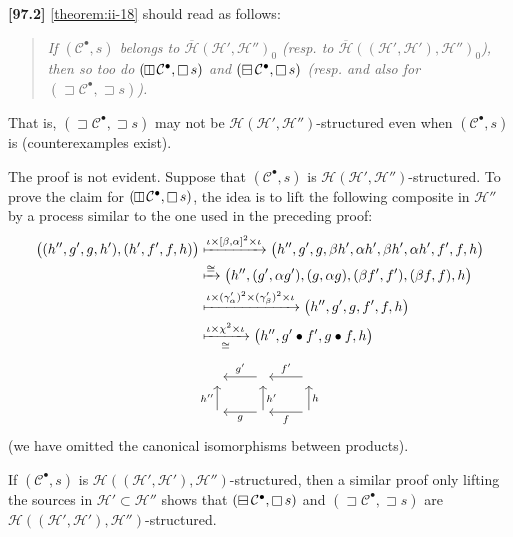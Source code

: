 \documentclass[a4paper,fleqn]{article}
\theoremstyle{plain}
\theoremstyle{definition}
\newenvironment{longcomm}[1]
  {\noindent\textbf{[#1]}\rmfamily}
  {}
\newcommand{\CC}{\mathcal{C}}
\newcommand{\HH}{\mathcal{H}}
\newcommand{\hsqbox}{{\boxminus}}
\newcommand{\vsqbox}{{\rotatebox{90}{$\boxminus$}}}
\DeclareMathOperator{\sq}{\square}
\DeclareMathOperator{\hsq}{\raisebox{-.05em}{$\hsqbox$}}
\DeclareMathOperator{\vsq}{\raisebox{-.1em}{$\vsqbox$}}
\DeclareMathOperator{\trio}{\sqsupset}
\newcommand{\smallbullet}{\bullet}
\begin{document}
\begin{longcomm}{97.2}
  \cref{theorem:ii-18} should read as follows:
  \begin{quote}
    \itshape
    If $(\CC^\smallbullet,s)$ belongs to $\overline{\HH}(\HH',\HH'')_0$ (resp. to $\overline{\HH}((\HH',\HH'),\HH'')_0$), then so too do $(\vsq\CC^\smallbullet,\sq s)$ and $(\hsq\CC^\smallbullet,\sq s)$ (resp. and also for $(\trio\CC^\smallbullet,\trio s)$).
  \end{quote}
  That is, $(\trio\CC^\smallbullet,\trio s)$ may not be $\HH(\HH',\HH'')$-structured even when $(\CC^\smallbullet,s)$ is (counterexamples exist).

  The proof is not evident.
  Suppose that $(\CC^\smallbullet,s)$ is $\HH(\HH',\HH'')$-structured.
  To prove the claim for $(\vsq\CC^\smallbullet,\sq s)$, the idea is to lift the following composite in $\HH''$ by a process similar to the one used in the preceding proof:
  \[
    \begin{aligned}
      \big(
        (h'',g',g,h'),
        (h',f',f,h)
      \big)
      &\xmapsto{\iota\times[\beta,\alpha]^2\times\iota}
      \big(
        h'', g', g, \beta h', \alpha h', \beta h', \alpha h', f', f, h
      \big)
    \\&\xmapsto{\cong}
      \big(
        h'',
        (g',\alpha g'),
        (g,\alpha g),
        (\beta f',f'),
        (\beta f, f),
        h
      \big)
    \\&\xmapsto{\iota\times(\gamma'_\alpha)^2\times(\gamma'_\beta)^2\times\iota}
      \big(
        h'', g', g, f', f, h
      \big)
    \\&\xmapsto[\cong]{\iota\times\chi^2\times\iota}
      \big(
        h'', g'\smallbullet f', g\smallbullet f, h
      \big)
    \end{aligned}
  \]
  \[
    \begin{tikzcd}
      {}
      & {} \ar[l,swap,"g'"]
      & {} \ar[l,swap,"f'"]
    \\{} \ar[u,"h''"]
      & {} \ar[l,"g"] \ar[u,swap,"h'"]
      & {} \ar[l,"f"] \ar[u,swap,"h"]
    \end{tikzcd}
  \]
  (we have omitted the canonical isomorphisms between products).

  If $(\CC^\smallbullet,s)$ is $\HH((\HH',\HH'),\HH'')$-structured, then a similar proof only lifting the sources in $\HH'\subset\HH''$ shows that $(\hsq\CC^\smallbullet,\sq s)$ and $(\trio\CC^\smallbullet,\trio s)$ are $\HH((\HH',\HH'),\HH'')$-structured.
\end{longcomm}
\end{document}
